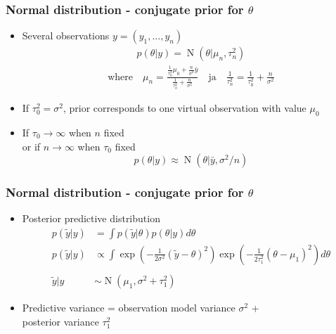 \documentclass[english,t]{beamer}
\DeclareMathOperator{\N}{N}
\begin{document}
\begin{frame}

  \frametitle{Normal distribution - conjugate prior for $\theta$}

  \begin{itemize}
  \item Several observations $y=(y_1,\ldots,y_n)$
    \begin{align*}
      p(\theta|y) = \N(\theta|\mu_n,\tau_n^2)
    \end{align*}
    \vskip -6mm
    \begin{align*}
      \text{where} \quad
      \mu_n=\frac{\frac{1}{\tau_0^2}\mu_0+\frac{n}{\sigma^2}\bar{y}}{\frac{1}{\tau_0^2}+\frac{n}{\sigma^2}} \quad
      \text{ja} \quad \frac{1}{\tau_n^2} = \frac{1}{\tau_0^2}+\frac{n}{\sigma^2}
    \end{align*}
  \item If $\tau_0^2=\sigma^2$, prior corresponds to one virtual observation with value $\mu_0$
    \pause
    \item If $\tau_0\rightarrow\infty$ when $n$ fixed\\
      or if $n\rightarrow\infty$ when $\tau_0$ fixed
      \begin{equation*}
        p(\theta|y) \approx \N(\theta|\bar{y},\sigma^2/n)
      \end{equation*}
  \end{itemize}

\end{frame}

\begin{frame}
  \frametitle{Normal distribution - conjugate prior for $\theta$}

  \begin{itemize}
  \item Posterior predictive distribution
    \begin{align*}
      p(\tilde{y}|y)&=\int p(\tilde{y}|\theta)p(\theta|y) d\theta \\
      p(\tilde{y}|y)& \propto\int
      \exp\left(-\frac{1}{2\sigma^2}(\tilde{y}-\theta)^2\right)\exp\left(-\frac{1}{2\tau_1^2}(\theta-\mu_1)^2\right) d\theta \\
      ~&~\\ 
      \tilde{y}|y &\sim \N(\mu_1,\sigma^2+\tau_1^2)
    \end{align*}
  \item Predictive variance = observation model variance $\sigma^2$ + \\
     posterior variance $\tau_1^2$

  \end{itemize}

\end{frame}


   
\end{document}
